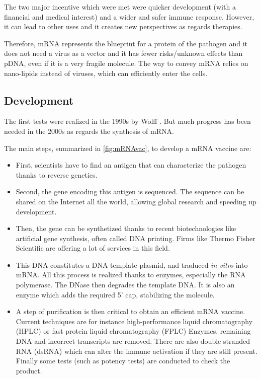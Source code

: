 \documentclass{article}
\begin{document}
                The two major incentive which were met were quicker development (with a financial and medical interest) and a wider and safer immune response.
                However, it can lead to other uses and it creates new perspectives as regards therapies.

                Therefore, mRNA represents the blueprint for a protein of the pathogen and it does not need a virus as a vector
                    and it has fewer risks/unknown effects than pDNA, even if it is a very fragile molecule.
                The way to convey mRNA relies on nano-lipids instead of viruses, which can efficiently enter the cells.


        \subsection{Development}

            The first tests were realized in the 1990s by Wolff \autocite{wolffDirectGeneTransfer1990}.
            But much progress has been needed in the 2000s as regards the synthesis of mRNA.

            The main steps, summarized in \ref{fig:mRNAvac}, to develop a mRNA vaccine are:
            \begin{itemize}
                \item First, scientists have to find an antigen that can characterize the pathogen thanks to reverse genetics.
                \item Second, the gene encoding this antigen is sequenced. 
                    The sequence can be shared on the Internet all the world, allowing global research and speeding up development.
                \item Then, the gene can be synthetized thanks to recent biotechnologies like artificial gene synthesis, often called DNA printing. 
                    Firms like Thermo Fisher Scientific are offering a lot of services in this field.
                \item This DNA constitutes a DNA template plasmid, and traduced \emph{in vitro} into mRNA.
                        All this process is realized thanks to enzymes, especially the RNA polymerase. The DNase then degrades the template DNA.
                        It is also an enzyme which adds the required 5' cap, stabilizing the molecule.
                \item A step of purification is then critical to obtain an efficient mRNA vaccine. 
                        Current techniques are for instance high-performance liquid chromatography (HPLC) or fast protein liquid chromatography (FPLC)
                        Enzymes, remaining DNA and incorrect transcripts are removed.
                        There are also double-stranded RNA (dsRNA) which can alter the immune activation if they are still present.
                        Finally some tests (such as potency tests) are conducted to check the product.
            \end{itemize} %
\end{document}
